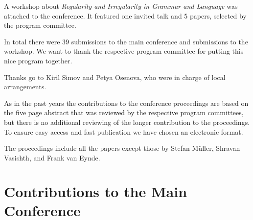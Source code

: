 \documentclass[11pt,a4paper,fleqn]{article}
\begin{document}
A workshop about \emph{Regularity and Irregularity in Grammar and Language}
was attached to the conference. It featured one invited talk
and 5 papers, selected by the program committee.

In total there were 39 submissions to the main conference and  submissions to the
workshop. %
We want to thank the respective program committee for putting this nice program together.




Thanks go to Kiril Simov and Petya Osenova, who were in charge of local arrangements.


As in the past years the contributions to the conference proceedings are based on the five page abstract
that was reviewed by the respective program committees, but there is no additional reviewing of the
longer contribution to the proceedings.
To ensure easy access and fast publication we have chosen an electronic format.


The proceedings include all the papers except those by Stefan Müller, Shravan Vasishth, and Frank
van Eynde.


\newpage
\part{Contributions to the Main Conference}
\thispagestyle{empty}
\newpage
        \setcounter{page}{6}
\thispagestyle{empty}
\end{document}
